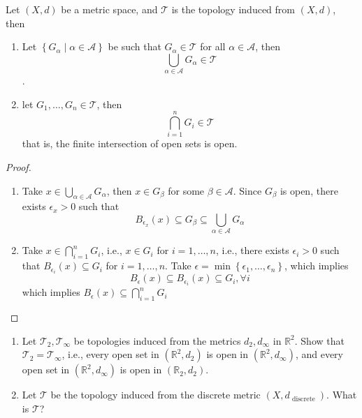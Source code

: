 \begin{proposition} \label{prop:open_metric_space} Let $(X, d)$ be a metric space, and \(\mathcal{T}\) is the topology induced from $(X, d)$, then
\begin{enumerate}
    \item Let \(\left\{  {{G}_{\alpha } \mid  \alpha  \in  \mathcal{A}}\right\}\) be such that \({G}_{\alpha } \in  \mathcal{T}\) for all $\alpha \in \mathcal{A}$, then \[\mathop{\bigcup }\limits_{{\alpha  \in  \mathcal{A}}}{G}_{\alpha } \in  \mathcal{T}\].
\item let \({G}_{1},\ldots,{G}_{n} \in  \mathcal{T}\), then 
\[\mathop{\bigcap }\limits_{{i = 1}}^{n}{G}_{i} \in  \mathcal{T}\]
that is, the finite intersection of open sets is open.
\end{enumerate}
\end{proposition}

\begin{proof} \begin{enumerate}
    \item Take \(x \in  \mathop{\bigcup }\limits_{{\alpha  \in  \mathcal{A}}}{G}_{\alpha }\), then \(x \in  {G}_{\beta }\) for some \(\beta  \in  \mathcal{A}\). Since \({G}_{\beta }\) is open, there exists \({\epsilon }_{x} > 0\) such that
\[
{B}_{{\epsilon }_{x}}\left( x\right)  \subseteq  {G}_{\beta } \subseteq  \mathop{\bigcup }\limits_{{\alpha  \in  \mathcal{A}}}{G}_{\alpha }
\]

\item Take \(x \in  \mathop{\bigcap }\limits_{{i = 1}}^{n}{G}_{i}\), i.e., \(x \in  {G}_{i}\) for \(i = 1,\ldots,n\), i.e., there exists \({\epsilon }_{i} > 0\) such that \({B}_{{\epsilon }_{i}}\left( x\right)  \subseteq  {G}_{i}\) for \(i = 1,\ldots,n\). Take \(\epsilon  = \min \left\{  {{\epsilon }_{1},\ldots,{\epsilon }_{n}}\right\}\), which implies
\[
{B}_{\epsilon }\left( x\right)  \subseteq  {B}_{{\epsilon }_{i}}\left( x\right)  \subseteq  {G}_{i},\forall i
\]
which implies \({B}_{\epsilon }\left( x\right)  \subseteq  \mathop{\bigcap }\limits_{{i = 1}}^{n}{G}_{i}\)
\end{enumerate}
\end{proof}

\begin{exercise}
\begin{enumerate}
    \item Let \({\mathcal{T}}_{2},{\mathcal{T}}_{\infty }\) be topologies induced from the metrics \({d}_{2},{d}_{\infty }\) in \({\mathbb{R}}^{2}\). Show that \({\mathcal{T}}_{2} = {\mathcal{T}}_{\infty }\), i.e., every open set in \(\left( {{\mathbb{R}}^{2},{d}_{2}}\right)\) is open in \(\left( {{\mathbb{R}}^{2},{d}_{\infty }}\right)\), and every open set in \(\left( {{\mathbb{R}}^{2},{d}_{\infty }}\right)\) is open in \(\left( {{\mathbb{R}}_{2},{d}_{2}}\right)\).

\item Let \(\mathcal{T}\) be the topology induced from the discrete metric \(\left( {X,{d}_{\text{ discrete }}}\right)\). What is \(\mathcal{T}\)?
\end{enumerate} 
\end{exercise}

